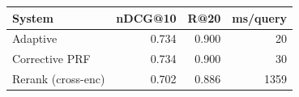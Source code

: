 \begin{tabular}{lrrr}
\toprule
System & nDCG@10 & R@20 & ms/query \\
\midrule
Adaptive & 0.734 & 0.900 & 20 \\
Corrective PRF & 0.734 & 0.900 & 30 \\
Rerank (cross-enc) & 0.702 & 0.886 & 1359 \\
\bottomrule
\end{tabular}
